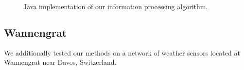 \documentclass{acmtrans2m}
\begin{document}
\begin{figure}
\begin{center}
\caption{Java implementation of our information processing algorithm.}
\label{screen}
\end{center}
\end{figure}


\subsection{Wannengrat}

We additionally tested our methods on a network of weather sensors located at Wannengrat near Davos, Switzerland.


% 
\end{document}

